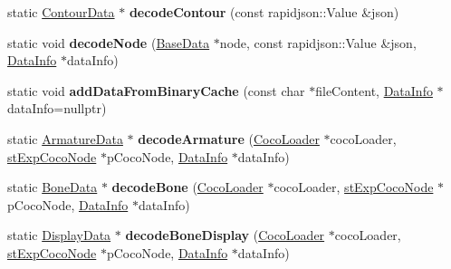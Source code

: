 \begin{DoxyCompactItemize}
\item 
\mbox{\label{classcocostudio_1_1DataReaderHelper_a2b65532eadb8f554bd27c63cca031c9c}} 
static \hyperlink{classcocostudio_1_1ContourData}{Contour\+Data} $\ast$ {\bfseries decode\+Contour} (const rapidjson\+::\+Value \&json)
\item 
\mbox{\label{classcocostudio_1_1DataReaderHelper_af14c0a232631e405b083d4bfb8245941}} 
static void {\bfseries decode\+Node} (\hyperlink{classcocostudio_1_1BaseData}{Base\+Data} $\ast$node, const rapidjson\+::\+Value \&json, \hyperlink{structcocostudio_1_1DataReaderHelper_1_1__DataInfo}{Data\+Info} $\ast$data\+Info)
\item 
\mbox{\label{classcocostudio_1_1DataReaderHelper_a60d2f8b28c9a71d6e7c49a4048aa7152}} 
static void {\bfseries add\+Data\+From\+Binary\+Cache} (const char $\ast$file\+Content, \hyperlink{structcocostudio_1_1DataReaderHelper_1_1__DataInfo}{Data\+Info} $\ast$data\+Info=nullptr)
\item 
\mbox{\label{classcocostudio_1_1DataReaderHelper_a85c83c5e28a5b00ad9dc2fe44bee79f1}} 
static \hyperlink{classcocostudio_1_1ArmatureData}{Armature\+Data} $\ast$ {\bfseries decode\+Armature} (\hyperlink{classcocostudio_1_1CocoLoader}{Coco\+Loader} $\ast$coco\+Loader, \hyperlink{structcocostudio_1_1stExpCocoNode}{st\+Exp\+Coco\+Node} $\ast$p\+Coco\+Node, \hyperlink{structcocostudio_1_1DataReaderHelper_1_1__DataInfo}{Data\+Info} $\ast$data\+Info)
\item 
\mbox{\label{classcocostudio_1_1DataReaderHelper_ad175a6b5f49c755ca4c9a92e6fb5d043}} 
static \hyperlink{classcocostudio_1_1BoneData}{Bone\+Data} $\ast$ {\bfseries decode\+Bone} (\hyperlink{classcocostudio_1_1CocoLoader}{Coco\+Loader} $\ast$coco\+Loader, \hyperlink{structcocostudio_1_1stExpCocoNode}{st\+Exp\+Coco\+Node} $\ast$p\+Coco\+Node, \hyperlink{structcocostudio_1_1DataReaderHelper_1_1__DataInfo}{Data\+Info} $\ast$data\+Info)
\item 
\mbox{\label{classcocostudio_1_1DataReaderHelper_afbe050aa823a841c3ce63a0a8aa7ea2f}} 
static \hyperlink{classcocostudio_1_1DisplayData}{Display\+Data} $\ast$ {\bfseries decode\+Bone\+Display} (\hyperlink{classcocostudio_1_1CocoLoader}{Coco\+Loader} $\ast$coco\+Loader, \hyperlink{structcocostudio_1_1stExpCocoNode}{st\+Exp\+Coco\+Node} $\ast$p\+Coco\+Node, \hyperlink{structcocostudio_1_1DataReaderHelper_1_1__DataInfo}{Data\+Info} $\ast$data\+Info)

\end{DoxyCompactItemize}
